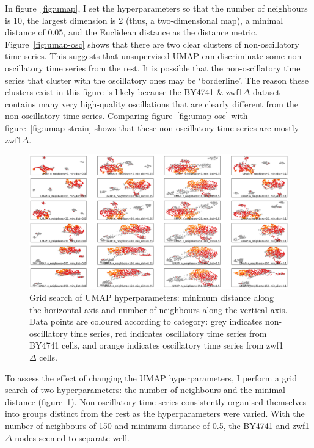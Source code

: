 In figure~\ref{fig:umap}, I set the hyperparameters so that the number of neighbours is 10, the largest dimension is 2 (thus, a two-dimensional map), a minimal distance of 0.05, and the Euclidean distance as the distance metric.
Figure~\ref{fig:umap-osc} shows that there are two clear clusters of non-oscillatory time series.
This suggests that unsupervised UMAP can discriminate some non-oscillatory time series from the rest.
It is possible that the non-oscillatory time series that cluster with the oscillatory ones may be `borderline'.
The reason these clusters exist in this figure is likely because the BY4741 \& zwf1$\Delta$ dataset contains many very high-quality oscillations that are clearly different from the non-oscillatory time series.
Comparing figure~\ref{fig:umap-osc} with figure~\ref{fig:umap-strain} shows that these non-oscillatory time series are mostly zwf1$\Delta$.

\begin{figure}
  \centering
    \includegraphics[width=0.9\linewidth]{IdenFeatures_20016_UMAP_22_cropped}
    \caption[
      Grid search of UMAP hyperparameters
    ]{
      Grid search of UMAP hyperparameters: minimum distance along the horizontal axis and number of neighbours along the vertical axis.
      Data points are coloured according to category: grey indicates non-oscillatory time series, red indicates oscillatory time series from BY4741 cells, and orange indicates oscillatory time series from zwf1$\Delta$ cells.
    }
  \label{fig:umap-gridsearch}
\end{figure}

To assess the effect of changing the UMAP hyperparameters, I perform a grid search of two hyperparameters: the number of neighbours and the minimal distance (figure~\ref{fig:umap-gridsearch}).
Non-oscillatory time series consistently organised themselves into groups distinct from the rest as the hyperparameters were varied.
With the number of neighbours of 150 and minimum distance of 0.5, the BY4741 and zwf1$\Delta$ nodes seemed to separate well.

